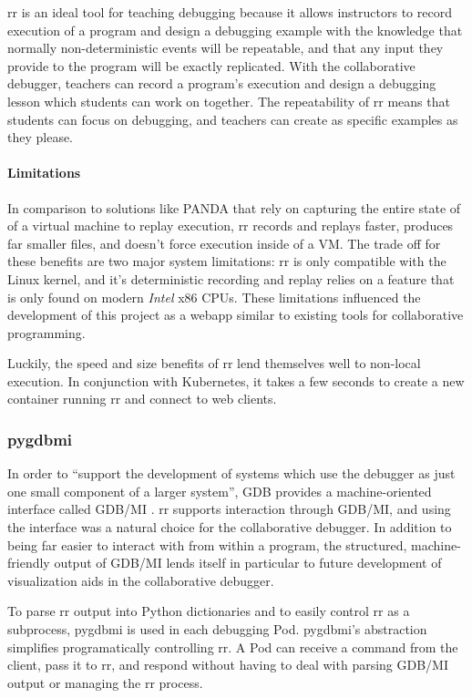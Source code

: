 \documentclass[12pt]{article}
\begin{document}
rr is an ideal tool for teaching debugging because it allows
instructors to record execution of a program and design a debugging
example with the knowledge that normally non-deterministic events will
be repeatable, and that any input they provide to the program will be
exactly replicated.  With the collaborative debugger, teachers can
record a program's execution and design a debugging lesson which
students can work on together.  The repeatability of rr means that
students can focus on debugging, and teachers can create as specific
examples as they please.

\paragraph{Limitations}

In comparison to solutions like PANDA\cite{10.1145/2843859.2843867}
that rely on capturing the entire state of of a virtual machine to
replay execution, rr records and replays faster, produces far smaller
files, and doesn't force execution inside of a
VM.\cite{DBLP:journals/corr/OCallahanJFHNP17} The trade off for these
benefits are two major system limitations: rr is only compatible with
the Linux kernel, and it's deterministic recording and replay relies
on a feature that is only found on modern \textit{Intel} x86 CPUs.
These limitations influenced the development of this project as a
webapp similar to existing tools for collaborative programming.
\par

Luckily, the speed and size benefits of rr lend themselves well to
non-local execution.  In conjunction with Kubernetes, it takes a few
seconds to create a new container running rr and connect to web
clients.

\subsubsection{pygdbmi}

In order to ``support the development of systems which use the
debugger as just one small component of a larger system'', GDB
provides a machine-oriented interface called GDB/MI \cite{gdbman}. rr
supports interaction through GDB/MI, and using the interface was a
natural choice for the collaborative debugger.  In addition to being
far easier to interact with from within a program, the structured,
machine-friendly output of GDB/MI lends itself in particular to future
development of visualization aids in the collaborative debugger.
\par
To parse rr output into Python dictionaries and to easily control rr
as a subprocess, pygdbmi \cite{pygdbmi} is used in each debugging Pod.
pygdbmi's abstraction simplifies programatically controlling rr.  A
Pod can receive a command from the client, pass it to rr, and respond
without having to deal with parsing GDB/MI output or managing the rr
process.
\end{document}
